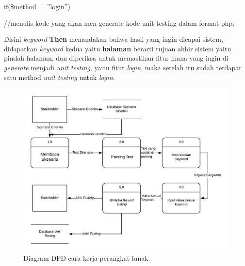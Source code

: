 \documentclass[a4paper,twoside]{article}
\begin{document}
\begin{enumerate}
\hspace{10mm}		if(\$method==”login”)
		
\hspace{15mm}			//menulis kode yang akan men generate kode unit testing dalam format php.

Disini \textit{keyword} \textbf{Then} menandakan bahwa hasil yang ingin dicapai sistem, didapatkan \textit{keyword} kedua yaitu \textbf{halaman} berarti tujuan akhir sistem yaitu pindah halaman, dan diperiksa untuk memastikan fitur mana yang ingin di \textit{generate} menjadi \textit{unit testing}, yaitu fitur \textit{login}, maka setelah itu sudah terdapat satu method \textit{unit testing} untuk \textit{login}. 

\begin{figure}[h!]
			\includegraphics[scale=0.80]{../DokumenSkripsi/gambar/dfddiagram}
			\centering
			\caption{Diagram DFD cara kerja perangkat lunak}
		\end{figure}
		

\end{enumerate}
\end{document}

